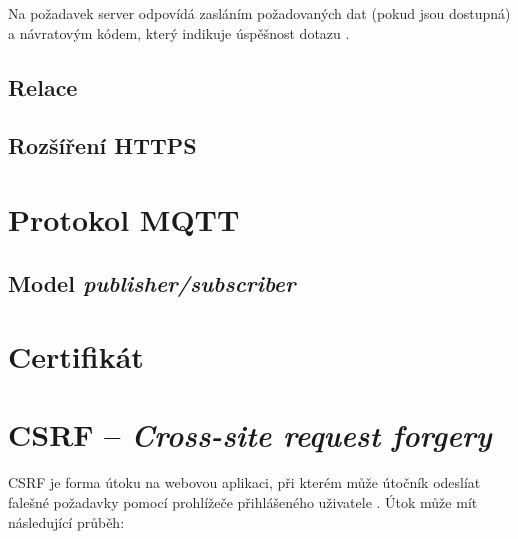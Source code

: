 Na požadavek server odpovídá zasláním požadovaných dat (pokud jsou dostupná) a návratovým kódem, který indikuje úspěšnost dotazu \cite{tcp}.

\subsection{Relace}

\subsection{Rozšíření HTTPS}

\section{Protokol MQTT}

\subsection{Model \textit{publisher/subscriber}}




\section{Certifikát}

\cite{tcp_sec}


\section{CSRF -- \textit{Cross-site request forgery}}

CSRF je forma útoku na webovou aplikaci, při kterém může útočník odeslíat falešné požadavky pomocí prohlížeče přihlášeného uživatele \cite{csrf_owasp}. Útok může mít následující průběh:

